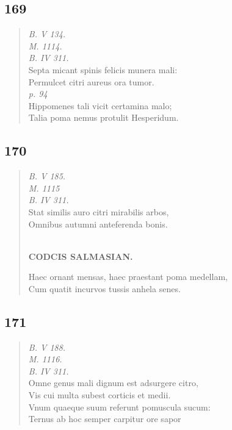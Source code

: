 \documentclass[11pt, a4paper]{report}
\begin{document}
            \subsection*{169}
      \begin{verse}
      \textit{B. V 134.} \\ \textit{M. 1114.} \\ \textit{B. IV 311.} \\ Septa micant spinis felicis munera mali: \\ Permulcet citri aureus ora tumor. \\ \textit{p. 94} \\ Hippomenes tali vicit certamina malo; \\ Talia poma nemus protulit Hesperidum. \\ 
      \end{verse}
  
            \subsection*{170}
      \begin{verse}
      \textit{B. V 185.} \\ \textit{M. 1115} \\ \textit{B. IV 311.} \\ Stat similis auro citri mirabilis arbos, \\ Omnibus autumni anteferenda bonis. \\ 
        ﻿\pagebreak 
    \begin{center} \textbf{CODCIS SALMASIAN.} \end{center} \marginpar{[151]} Haec ornant mensas, haec praestant poma medellam, \\ Cum quatit incurvos tussis anhela senes. \\ 
      \end{verse}
  
            \subsection*{171}
      \begin{verse}
      \textit{B. V 188.} \\ \textit{M. 1116.} \\ \textit{B. IV 311.} \\ Omne genus mali dignum est adsurgere citro, \\ Vis cui multa subest corticis et medii. \\ Vnum quaeque suum referunt pomuscula sucum: \\ Ternus ab hoc semper carpitur ore sapor \\ 
      \end{verse}
  
\end{document}
